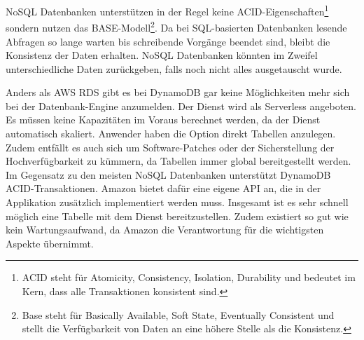 NoSQL Datenbanken unterstützen in der Regel keine ACID-Eigenschaften\footnote{ACID steht für Atomicity, Consistency, Isolation, Durability und bedeutet im Kern, dass
alle Transaktionen konsistent sind.} sondern nutzen das BASE-Modell\footnote{Base steht für Basically Available, Soft State, Eventually Consistent und
stellt die Verfügbarkeit von Daten an eine höhere Stelle als die Konsistenz.}.
Da bei SQL-basierten Datenbanken lesende Abfragen so lange warten bis schreibende Vorgänge beendet sind, bleibt die Konsistenz der Daten erhalten.
NoSQL Datenbanken könnten im Zweifel unterschiedliche Daten zurückgeben, falls noch nicht alles ausgetauscht wurde. \cite{Datenbankvergleich}

Anders als AWS RDS gibt es bei DynamoDB gar keine Möglichkeiten mehr sich bei der Datenbank-Engine anzumelden. Der Dienst wird als Serverless angeboten.
Es müssen keine Kapazitäten im Voraus berechnet werden, da der Dienst automatisch skaliert.
Anwender haben die Option direkt Tabellen anzulegen.
Zudem entfällt es auch sich um Software-Patches oder der Sicherstellung der Hochverfügbarkeit zu kümmern, da Tabellen immer global bereitgestellt werden.
Im Gegensatz zu den meisten NoSQL Datenbanken unterstützt DynamoDB ACID-Transaktionen. Amazon bietet dafür eine eigene API an, die in der Applikation zusätzlich
implementiert werden muss. Insgesamt ist es sehr schnell möglich eine Tabelle mit dem Dienst bereitzustellen. Zudem existiert so gut wie kein Wartungsaufwand,
da Amazon die Verantwortung für die wichtigsten Aspekte übernimmt.\cite{DynamoDB}

